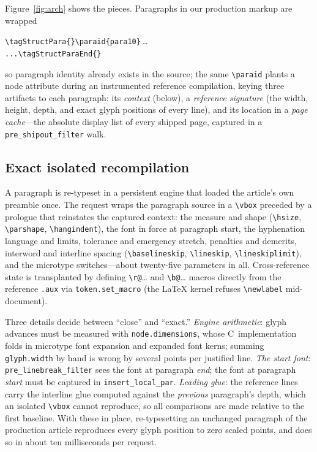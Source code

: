 \documentclass{ltugboat}
\begin{document}
Figure~\ref{fig:arch} shows the pieces. Paragraphs in our production
markup are wrapped
\begin{center}\small
\verb|\tagStructPara{}\paraid{para10}|\,\dots\\
\verb|...\tagStructParaEnd{}|
\end{center}
so paragraph identity already exists in the
source; the same \verb|\paraid| plants a node attribute during an
instrumented reference compilation, keying three artifacts to each
paragraph: its \emph{context} (below), a \emph{reference signature} (the
width, height, depth, and exact glyph positions of every line), and its
location in a \emph{page cache}---the absolute display list of every
shipped page, captured in a \verb|pre_shipout_filter| walk.

\subsection{Exact isolated recompilation}

A paragraph is re-typeset in a persistent engine that loaded the article's
own preamble once. The request wraps the paragraph source in a
\verb|\vbox| preceded by a prologue that reinstates the captured context:
the measure and shape (\verb|\hsize|, \verb|\parshape|,
\verb|\hangindent|), the font in force at paragraph start, the hyphenation
language and limits, tolerance and emergency stretch, penalties and
demerits, interword and interline spacing
(\verb|\baselineskip|, \verb|\lineskip|, \verb|\lineskiplimit|), and the
\textsf{microtype} switches---about twenty-five parameters in all.
Cross-reference state is transplanted by defining \verb|\r@|\dots{} and
\verb|\b@|\dots{} macros directly from the reference \verb|.aux| via
\verb|token.set_macro| (the \LaTeX{} kernel refuses
\verb|\newlabel| mid-document).

Three details decide between ``close'' and ``exact.''
\emph{Engine arithmetic}: glyph advances must be measured with
\verb|node.dimensions|, whose C~implementation folds in
\textsf{microtype} font expansion and expanded font kerns; summing
\verb|glyph.width| by hand is wrong by several points per justified line.
\emph{The start font}: \verb|pre_linebreak_filter| sees the font at
paragraph \emph{end}; the font at paragraph \emph{start} must be captured
in \verb|insert_local_par|.
\emph{Leading glue}: the reference lines carry the interline glue computed
against the \emph{previous} paragraph's depth, which an isolated
\verb|\vbox| cannot reproduce, so all comparisons are made relative to the
first baseline. With these in place, re-typesetting an unchanged paragraph
of the production article reproduces every glyph position to zero scaled
points, and does so in about ten milliseconds per request.
\end{document}
